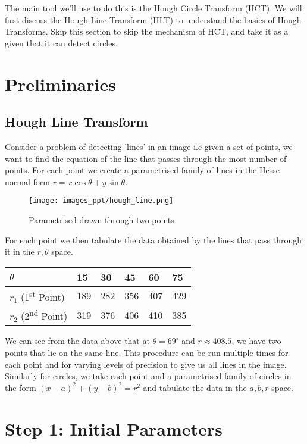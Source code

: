 \documentclass[hidelinks]{book}
\numberwithin{equation}{section}
\newcommand{\ts}{\textsuperscript}
\begin{document}
The main tool we'll use to do this is the Hough Circle Transform (HCT). We will first discuss the Hough Line Transform (HLT) to understand the basics of Hough Transforms. Skip this section to skip the mechanism of HCT, and take it as a given that it can detect circles.

\section{Preliminaries}\label{sec:prelim}
\subsection{Hough Line Transform}\label{ssec:hlt}
Consider a problem of detecting 'lines' in an image i.e given a set of points, we want to find the equation of the line that passes through the most number of points. For each point we create a parametrised family of lines in the Hesse normal form $r=x\cos \theta +y\sin \theta$.

\begin{figure}[H]
  \centering
  \texttt{[image: images\_ppt/hough\_line.png]}
  \caption{Parametrised drawn through two points}
\end{figure}

For each point we then tabulate the data obtained by the lines that pass through it in the $r, \theta$ space.

\begin{table}[!ht]
    \centering
    \begin{tabular}{|l|l|l|l|l|l|}
    \hline
        $\theta$ & 15 & 30 & 45 & 60 & 75 \\ \hline
        $r_1$ (1\ts{st} Point) & 189 & 282 & 356 & 407 & 429 \\ \hline
        $r_2$ (2\ts{nd} Point) & 319 & 376 & 406 & 410 & 385 \\ \hline
    \end{tabular}
\end{table}

\noindent We can see from the data above that at $\theta=69^\circ$ and $r\approx 408.5$, we have two points that lie on the same line. This procedure can be run multiple times for each point and for varying levels of precision to give us all lines in the image. Similarly for circles, we take each point and a parametrised family of circles in the form $(x-a)^2 + (y-b)^2 = r^2$ and tabulate the data in the $a, b, r$ space.

\section{Step 1: Initial Parameters}\label{sec:step1}
\end{document}
